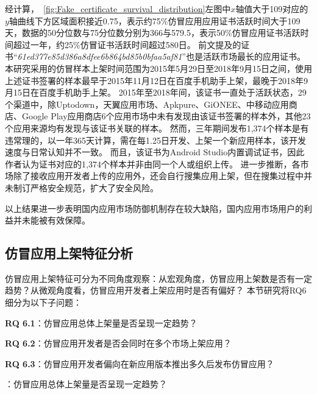 经计算，~\autoref{fig:Fake_certificate_survival_distribution}左图中$x$轴值大于109对应的$y$轴曲线下方区域面积接近0.75，表示约75\%仿冒应用应用证书活跃时间大于109天，数据的50分位数与75分位数分别为366与579.5，表示50\%仿冒应用证书活跃时间超过一年，约25\%仿冒证书活跃时间超过580日。
前文提及的证书``\emph{61ed377e85d386a8dfee6b864bd85b0bfaa5af81}''也是活跃市场最长的应用证书。
本研究采用的仿冒样本上架时间范围为2015年5月29日至2018年9月15日之间，使用上述证书签署的样本最早于2015年11月12日在百度手机助手上架，最晚于2018年9月15日在百度手机助手上架。
2015年至2018年间，该证书一直处于活跃状态，29个渠道中，除Uptodown，天翼应用市场、Apkpure、GiONEE、中移动应用商店、Google Play应用商店6个应用市场中未有发现由该证书签署的样本外，其他23个应用来源均有发现与该证书关联的样本。
然而，三年期间发布1,374个样本是有违常理的，以一年365天计算，需在每1.25日开发、上架一个新应用样本，该开发速度与日常认知并不一致。
而且，该证书为Android Studio内置调试证书，因此作者认为证书对应的1,374个样本并非由同一个人或组织上传。
进一步推断，各市场除了接收应用开发者上传的应用外，还会自行搜集应用上架，但在搜集过程中并未制订严格安全规范，扩大了安全风险。

以上结果进一步表明国内应用市场防御机制存在较大缺陷，国内应用市场用户的利益并未能被有效保障。

\subsection{仿冒应用上架特征分析}


仿冒应用上架特征可分为不同角度观察：从宏观角度，仿冒应用上架数是否有一定趋势？从微观角度看，仿冒应用开发者上架应用时是否有偏好？
本节研究将RQ6细分为以下子问题：

{\bf RQ 6.1}：仿冒应用总体上架量是否呈现一定趋势？

{\bf RQ 6.2}：仿冒应用开发者是否会同时在多个市场上架应用？

{\bf RQ 6.3}：仿冒应用开发者偏向在新应用版本推出多久后发布仿冒应用？

：仿冒应用总体上架量是否呈现一定趋势？

